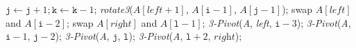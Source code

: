 \documentclass[prodmode,acmtalg]{acmsmall}
\begin{document}
\begin{algorithm}
\begin{algorithmic}[1]
                    \EndIf
                \EndIf
                \State $\texttt{j} \gets \texttt{j} + 1; \texttt{k} \gets \texttt{k} - 1$;
            \EndIf
        \EndWhile
        \State \textit{rotate3}($\textit{A}[\textit{left} + 1]$, $\textit{A}[\texttt{i} - 1]$,
                                $\textit{A}[\texttt{j} - 1]$);
        \State swap $\textit{A}[\textit{left}]$ and $\textit{A}[\texttt{i} - 2]$;
        \State swap $\textit{A}[\textit{right}]$ and $\textit{A}[\texttt{l} - 1]$;
        \State \textit{3-Pivot}(\textit{A}, \textit{left}, $\texttt{i} - 3$);
        \State \textit{3-Pivot}(\textit{A}, $\texttt{i} - 1$, $\texttt{j} - 2$);
        \State \textit{3-Pivot}(\textit{A}, $\texttt{j}$, $\texttt{l}$);
        \State \textit{3-Pivot}(\textit{A}, $\texttt{l} + 2$, $\textit{right}$);
    \end{algorithmic}
\end{algorithm}




\newpage
\end{document}
